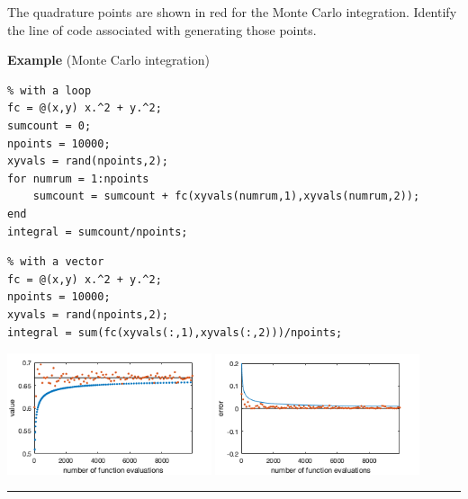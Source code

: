 \documentclass[12pt,letterpaper,noanswers]{exam}
\begin{document}
The quadrature points are shown in red for the Monte Carlo integration.  Identify the line of code associated with generating those points.

\vspace{1in}

\noindent\textbf{Example} (Monte Carlo integration)

\begin{multicols}{2}
\begin{lstlisting}
% with a loop
fc = @(x,y) x.^2 + y.^2;
sumcount = 0;
npoints = 10000;
xyvals = rand(npoints,2);
for numrum = 1:npoints
    sumcount = sumcount + fc(xyvals(numrum,1),xyvals(numrum,2));
end
integral = sumcount/npoints;
\end{lstlisting}
\columnbreak
\begin{lstlisting}
% with a vector
fc = @(x,y) x.^2 + y.^2;
npoints = 10000;
xyvals = rand(npoints,2);
integral = sum(fc(xyvals(:,1),xyvals(:,2)))/npoints;
\end{lstlisting}
\end{multicols}

\includegraphics[width=0.45\textwidth]{img/C15MC.png}
\includegraphics[width=0.45\textwidth]{img/C15MCerror.png}

\vspace{0.2cm}
\hrule
\vspace{0.2cm}
\end{document}
